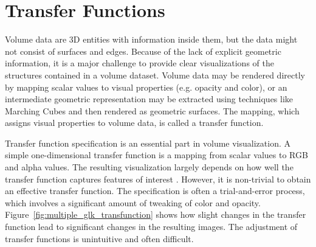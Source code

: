 \section{Transfer Functions \label{literature_of_transfer_function}}
Volume data are 3D entities with information inside them, but the data might not consist of surfaces and edges.
Because of the lack of explicit geometric information, %
it is a major challenge to provide clear visualizations of the structures contained in a volume dataset.
Volume data may be rendered directly by mapping scalar values to visual properties (e.g. opacity and color), or an intermediate geometric representation may be extracted using techniques like Marching Cubes \cite{lorensen_marching_1987} and then rendered as geometric surfaces. The mapping, which assigns visual properties to volume data, is called a transfer function.

Transfer function specification is an essential part in volume visualization.
A simple one-dimensional transfer function is a mapping from scalar values to RGB and alpha values.
The resulting visualization largely depends on how well the transfer function captures features of interest \cite{kniss_multidimensional_2002}.
However, it is non-trivial to obtain an effective transfer function. The specification is often a trial-and-error process, which involves a significant amount of tweaking of color and opacity. Figure~\ref{fig:multiple_glk_transfunction} shows how slight changes in the transfer function lead to significant changes in the resulting images. The adjustment of transfer functions is unintuitive and often difficult.

